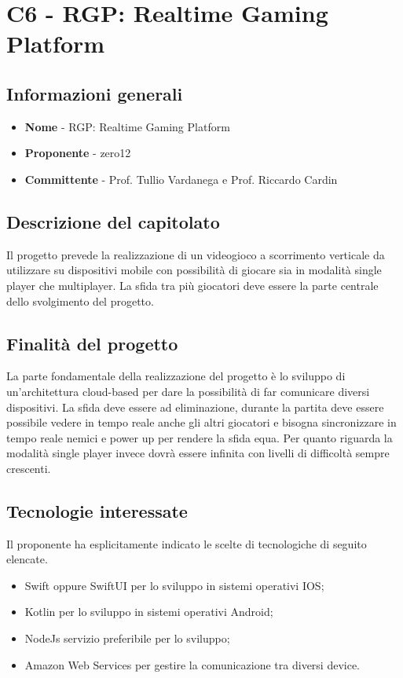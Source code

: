 \chapter{C6 - RGP: Realtime Gaming Platform}
\section{Informazioni generali}
\begin{itemize}
	\item \textbf{Nome} - RGP: Realtime Gaming Platform
	\item \textbf{Proponente} - zero12
	\item \textbf{Committente} - Prof. Tullio Vardanega e Prof. Riccardo Cardin
\end{itemize}
\section{Descrizione del capitolato}
Il progetto prevede la realizzazione di un videogioco a scorrimento verticale da utilizzare su dispositivi mobile con possibilità di giocare sia in modalità single player che multiplayer. La sfida tra più giocatori deve essere la parte centrale dello svolgimento del progetto.
\section{Finalità del progetto}
La parte fondamentale della realizzazione del progetto è lo sviluppo di un'architettura cloud-based  per dare la possibilità di far comunicare diversi dispositivi. La sfida deve essere ad eliminazione, durante la partita deve essere possibile vedere in tempo reale anche gli altri giocatori e bisogna sincronizzare in tempo reale nemici e power up per rendere la sfida equa. Per quanto riguarda la modalità single player invece dovrà essere infinita con livelli di difficoltà sempre crescenti.
\section{Tecnologie interessate}
Il proponente ha esplicitamente indicato le scelte di tecnologiche di seguito elencate.
\begin{itemize}
	\item Swift oppure SwiftUI per lo sviluppo in sistemi operativi IOS;
	\item Kotlin per lo sviluppo in sistemi operativi Android;
	\item NodeJs servizio preferibile per lo sviluppo;
	\item Amazon Web Services per gestire la comunicazione tra diversi device.
\end{itemize}
